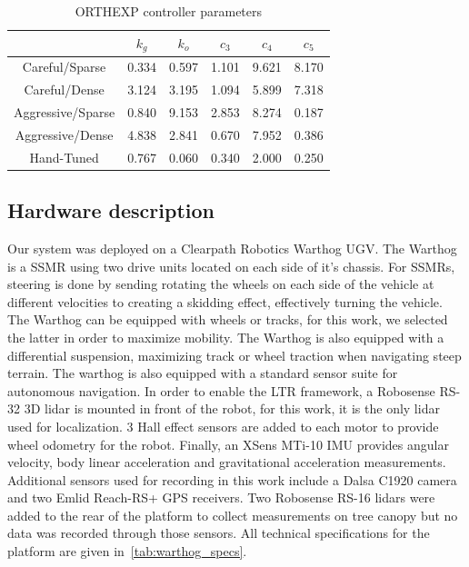 

\begin{table}[htpb]
	\caption{\ac{ORTHEXP} controller parameters} \label{tab:orthexp_params}
	\begin{center}
		\begin{tabular}{|c|c|c|c|c|c|}
			\hline
			& $k_{g}$ & $k_{o}$ & $c_{3}$ & $c_{4}$ & $c_{5}$ \\
			\hline\hline
			Careful/Sparse & 0.334 & 0.597 & 1.101 & 9.621 & 8.170 \\ \hline
			Careful/Dense & 3.124 & 3.195 & 1.094 & 5.899 & 7.318 \\ \hline
			Aggressive/Sparse & 0.840 & 9.153 & 2.853 & 8.274 & 0.187 \\ \hline
			Aggressive/Dense & 4.838 & 2.841 & 0.670 & 7.952 & 0.386 \\ \hline
			Hand-Tuned & 0.767 & 0.060 & 0.340 & 2.000 & 0.250 \\
			\hline
		\end{tabular}
	\end{center}
\end{table}

\subsection{Hardware description}
\label{sec:hardware}

Our system was deployed on a Clearpath Robotics Warthog \ac{UGV}. 
The Warthog is a \ac{SSMR} using two drive units located on each side of it's chassis. 
For \acp{SSMR}, steering is done by sending rotating the wheels on each side of the vehicle at different velocities to creating a skidding effect, effectively turning the vehicle.
The Warthog can be equipped with wheels or tracks, for this work, we selected the latter in order to maximize mobility. 
The Warthog is also equipped with a differential suspension, maximizing track or wheel traction when navigating steep terrain.
The warthog is also equipped with a standard sensor suite for autonomous navigation. 
In order to enable the \ac{LTR} framework, a Robosense RS-32 3D lidar is mounted in front of the robot, for this work, it is the only lidar used for localization.
3 Hall effect sensors are added to each motor to provide wheel odometry for the robot. 
Finally, an XSens MTi-10 \ac{IMU} provides angular velocity, body linear acceleration and gravitational acceleration measurements. 
Additional sensors used for recording in this work include a Dalsa C1920 camera and two Emlid Reach-RS+ \ac{GPS} receivers.
Two Robosense RS-16 lidars were added to the rear of the platform to collect measurements on tree canopy but no data was recorded through those sensors. 
All technical specifications for the platform are given in~\autoref{tab:warthog_specs}.

